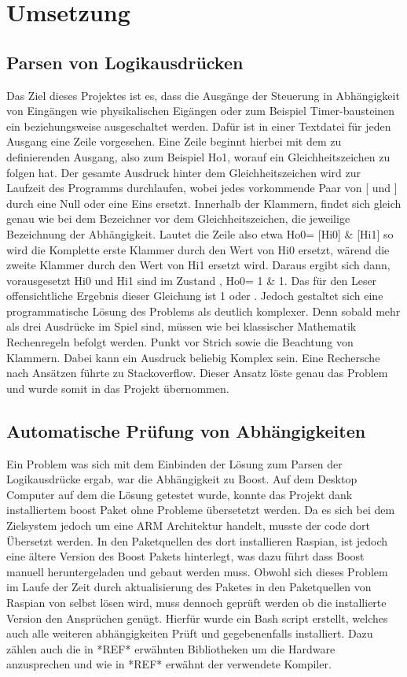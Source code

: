 \section{Umsetzung}\label{kap:ums}


\subsection{Parsen von Logikausdrücken}\label{kap:ums:parsing}
Das Ziel dieses Projektes ist es, dass die Ausgänge der Steuerung in Abhängigkeit von Eingängen wie physikalischen Eigängen oder zum Beispiel Timer-bausteinen ein beziehungsweise ausgeschaltet werden. Dafür ist in einer Textdatei für jeden Ausgang eine Zeile vorgesehen. Eine Zeile beginnt hierbei mit dem zu definierenden Ausgang, also zum Beispiel Ho1, worauf ein Gleichheitszeichen zu folgen hat. Der gesamte Ausdruck hinter dem Gleichheitszeichen wird zur Laufzeit des Programms durchlaufen, wobei jedes vorkommende Paar von [ und ] durch eine Null oder eine Eins ersetzt. Innerhalb der Klammern, findet sich gleich genau wie bei dem Bezeichner vor dem Gleichheitszeichen, die jeweilige Bezeichnung der Abhängigkeit. Lautet die Zeile also etwa Ho0= [Hi0] \& [Hi1] so wird die Komplette erste Klammer durch den Wert von Hi0 ersetzt, wärend die zweite Klammer  durch den Wert von Hi1 ersetzt wird. Daraus ergibt sich dann, vorausgesetzt Hi0 und Hi1 sind im Zustand , Ho0= 1 \& 1. Das für den Leser offensichtliche Ergebnis dieser Gleichung ist 1 oder . Jedoch gestaltet sich eine programmatische Lösung des Problems als deutlich komplexer. Denn sobald mehr als drei Ausdrücke im Spiel sind, müssen wie bei klassischer Mathematik Rechenregeln befolgt werden. Punkt vor Strich sowie die Beachtung von Klammern. Dabei kann ein Ausdruck beliebig Komplex sein. Eine Rechersche nach Ansätzen führte zu Stackoverflow.\cite{URL:Parsing} Dieser Ansatz löste genau das Problem und wurde somit in das Projekt übernommen. 
%
\subsection{Automatische Prüfung von Abhängigkeiten}\label{kap:ums:abh}
Ein Problem was sich mit dem Einbinden der Lösung zum Parsen der Logikausdrücke ergab, war die Abhängigkeit zu Boost. Auf dem Desktop Computer auf dem die Lösung getestet wurde, konnte das Projekt dank installiertem boost Paket ohne Probleme übersetetzt werden. Da es sich bei dem  Zielsystem jedoch um eine ARM Architektur handelt, musste der code dort Übersetzt werden. In den Paketquellen des dort installieren Raspian, ist jedoch eine ältere Version des Boost Pakets hinterlegt, was dazu führt dass Boost manuell heruntergeladen und gebaut werden muss. Obwohl sich dieses Problem im Laufe der Zeit durch aktualisierung des Paketes in den Paketquellen von Raspian von selbst lösen wird, muss dennoch geprüft werden ob die installierte Version den Ansprüchen genügt. Hierfür wurde ein Bash script erstellt, welches auch alle weiteren abhängigkeiten Prüft und gegebenenfalls installiert. Dazu zählen auch die in *REF* erwähnten Bibliotheken um die Hardware anzusprechen und wie in *REF* erwähnt der verwendete Kompiler. 
 
